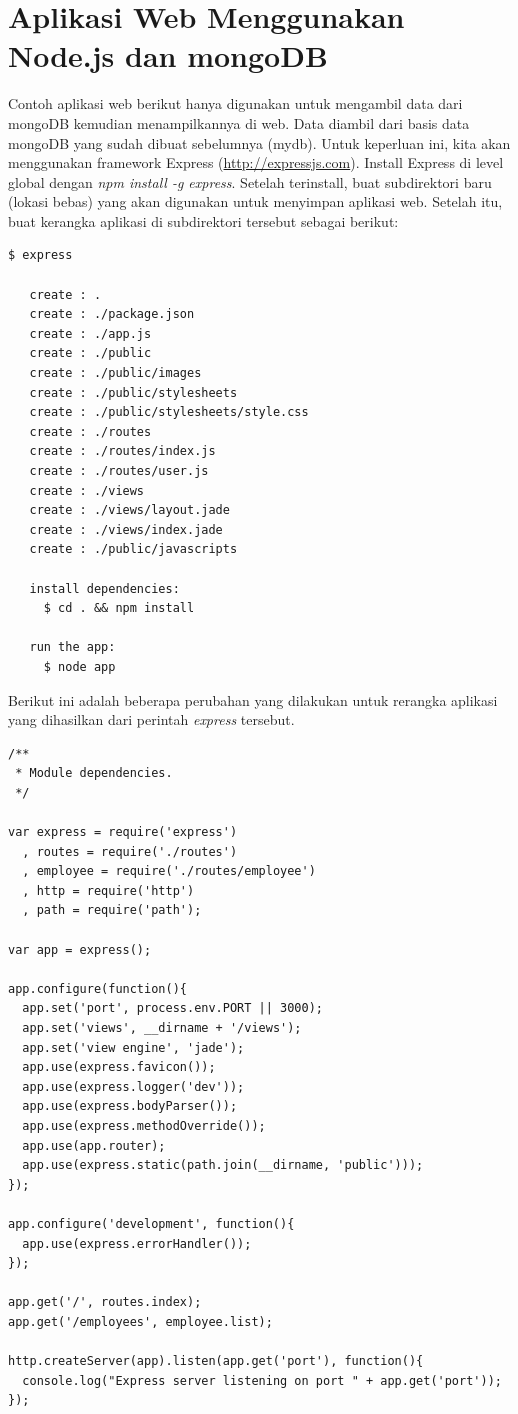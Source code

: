 \section{Aplikasi Web Menggunakan Node.js dan mongoDB}

Contoh aplikasi web berikut hanya digunakan untuk mengambil data dari mongoDB kemudian menampilkannya di web. Data diambil dari basis data mongoDB yang sudah dibuat sebelumnya (mydb). Untuk keperluan ini, kita akan menggunakan framework Express (\url{http://expressjs.com}). Install Express di level global dengan \textit{npm install -g express}. Setelah terinstall, buat subdirektori baru (lokasi bebas) yang akan digunakan untuk menyimpan aplikasi web. Setelah itu, buat kerangka aplikasi di subdirektori tersebut sebagai berikut:

\lstset{language=bash,caption=Mengakses mongoDB dari Node.js}
\begin{lstlisting}
$ express 

   create : .
   create : ./package.json
   create : ./app.js
   create : ./public
   create : ./public/images
   create : ./public/stylesheets
   create : ./public/stylesheets/style.css
   create : ./routes
   create : ./routes/index.js
   create : ./routes/user.js
   create : ./views
   create : ./views/layout.jade
   create : ./views/index.jade
   create : ./public/javascripts

   install dependencies:
     $ cd . && npm install

   run the app:
     $ node app
\end{lstlisting}

Berikut ini adalah beberapa perubahan yang dilakukan untuk rerangka aplikasi yang dihasilkan dari perintah \textit{express} tersebut.

\lstset{language=JavaScript,caption=app.js}
\begin{lstlisting}
/**
 * Module dependencies.
 */

var express = require('express')
  , routes = require('./routes')
  , employee = require('./routes/employee')
  , http = require('http')
  , path = require('path');

var app = express();

app.configure(function(){
  app.set('port', process.env.PORT || 3000);
  app.set('views', __dirname + '/views');
  app.set('view engine', 'jade');
  app.use(express.favicon());
  app.use(express.logger('dev'));
  app.use(express.bodyParser());
  app.use(express.methodOverride());
  app.use(app.router);
  app.use(express.static(path.join(__dirname, 'public')));
});

app.configure('development', function(){
  app.use(express.errorHandler());
});

app.get('/', routes.index);
app.get('/employees', employee.list);

http.createServer(app).listen(app.get('port'), function(){
  console.log("Express server listening on port " + app.get('port'));
});
\end{lstlisting}

